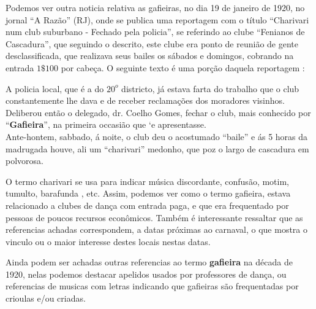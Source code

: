Podemos ver outra noticia relativa as gafieiras, no dia 19 de janeiro de 1920, 
no jornal ``A Razão'' (RJ), onde se
publica uma reportagem com o título 
``Charivari num club suburbano - Fechado pela policia'',
se referindo ao clube ``Fenianos de Cascadura'',
que seguindo o descrito, este clube era 
ponto de reunião de gente desclassificada, 
que realizava seus bailes os sábados e domingos,
cobrando na entrada $1\$100$ por cabeça.
O seguinte texto é uma porção daquela reportagem \cite[pp. 4]{oldgafieira4} \cite[pp. 629]{spielmann2016reflexoes}:
\begin{citando}
A policia local, que é a do $20^o$ districto,
já estava farta do trabalho que o club 
constantemente lhe dava e de receber reclamações 
dos moradores visinhos.\\
Deliberou então o delegado, dr. Coelho
Gomes, fechar o club, mais conhecido por 
``\textbf{Gafieira}'', na primeira occasião que `e apresentasse.\\
Ante-hontem, sabbado, á noite, o club 
deu o acostumado ``baile'' e ás 5 horas da 
madrugada houve, ali um ``charivari'' medonho,
que poz o largo de cascadura em polvorosa. 
\end{citando}
O termo charivari se usa para indicar música discordante, 
confusão, motim, tumulto, barafunda \cite[pp. 53]{almeida1996dicionario}, etc.
Assim, podemos ver como o termo gafieira, 
estava relacionado a clubes de dança com entrada paga,
e que era frequentado por pessoas de poucos recursos econômicos. 
Também é interessante ressaltar que as referencias achadas correspondem,
a datas próximas ao carnaval, o que mostra o vinculo ou o maior interesse 
destes locais nestas datas. 

Ainda podem ser achadas outras referencias ao termo \textbf{gafieira} na década de 1920,
nelas podemos destacar apelidos usados por professores de dança,
ou referencias de musicas com letras indicando que gafieiras 
são frequentadas por crioulas e/ou criadas.



